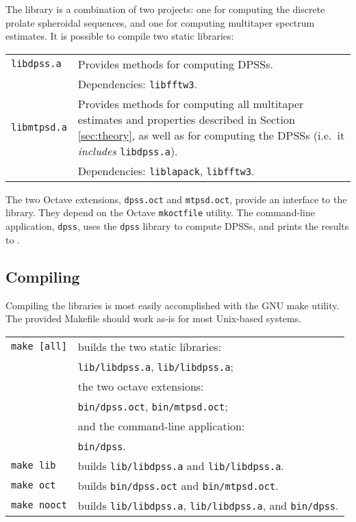 The  library is a combination of two projects: one for computing the discrete prolate spheroidal sequences, and one for computing multitaper spectrum estimates.  It is possible to compile two static libraries:
\smallskip

\begin{tabular}{lp{\textwidth-25ex}}
    \texttt{libdpss.a}\index{libdpss@\texttt{libdpss}} & Provides methods for computing DPSSs.\\
    & Dependencies: \texttt{libfftw3}.\\
    \texttt{libmtpsd.a}\index{libmtpsd@\texttt{libmtpsd}} & Provides methods for computing all multitaper estimates and properties described in Section \ref{sec:theory}, as well as for computing the DPSSs (i.e.~it \emph{includes} \texttt{libdpss.a}).\\
    & Dependencies: \texttt{liblapack}, \texttt{libfftw3}.
\end{tabular}
\smallskip

\noindent The two Octave extensions, \texttt{dpss.oct} and \texttt{mtpsd.oct}, provide an interface to the library.  They depend on the Octave \texttt{mkoctfile} utility.  The command-line application, \texttt{dpss}, uses the \texttt{dpss} library to compute DPSSs, and prints the results to .

\subsection{Compiling}

Compiling the libraries is most easily accomplished with the GNU make utility.  The provided Makefile should work as-is for most Unix-based systems.
\smallskip

\noindent \begin{tabular}{@{\hspace*{4ex}}p{17ex}@{\hspace*{3ex}}p{\textwidth-28ex}@{\hspace*{4ex}}}
    \texttt{make [all]} & builds the two static libraries: \\
                        & \hspace*{4ex}\texttt{lib/libdpss.a}, \texttt{lib/libdpss.a}; \\
                        & the two octave extensions: \\
                        & \hspace*{4ex}\texttt{bin/dpss.oct}, \texttt{bin/mtpsd.oct}; \\
                        & and the command-line application:\\
                        & \hspace*{4ex}\texttt{bin/dpss}.\\
    \texttt{make lib} & builds \texttt{lib/libdpss.a} and \texttt{lib/libdpss.a}.\\
    \texttt{make oct} & builds \texttt{bin/dpss.oct} and \texttt{bin/mtpsd.oct}.\\
    \texttt{make nooct} & builds \texttt{lib/libdpss.a}, \texttt{lib/libdpss.a}, and \texttt{bin/dpss}.
\end{tabular}
\smallskip

